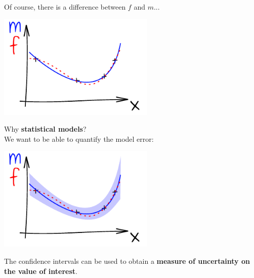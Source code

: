 \begin{frame}{}
Of course, there is a difference between $f$ and $m$...
\begin{center}
\includegraphics[height=5cm]{1_stat_models/figures/ink_mf}
\end{center}
\end{frame}

\begin{frame}{}
Why \textbf{statistical models}? \\We want to be able to quantify the model error:
\begin{center}
\includegraphics[height=5cm]{1_stat_models/figures/ink_mconfint}
\end{center}
The confidence intervals can be used to obtain a \textbf{measure of uncertainty on the value of interest}.
\end{frame}

